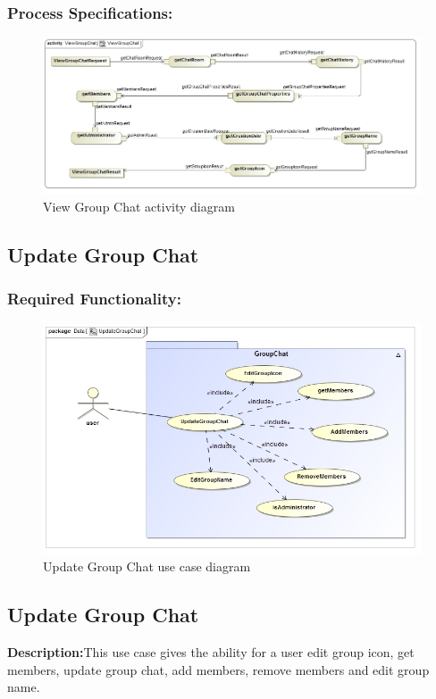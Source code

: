 \documentclass[a4paper]{article}
\begin{document}
\subsubsection{Process Specifications:} 
\begin{figure}[H]
\includegraphics[width=1\linewidth]{./pictures/view_GroupChat.jpg}
\caption{View Group Chat activity diagram}
\end{figure}


\subsection{Update Group Chat}
\subsubsection{Required Functionality:} 
\begin{figure}[H]
\includegraphics[width=1\linewidth]{./pictures/updateGroupChat.jpg}
\caption{Update Group Chat use case diagram}
\end{figure}

\subsection{Update Group Chat}
\textbf{Description:}This use case gives the ability for a user edit group icon, get members, update group chat, add members, remove members and edit group name. 
\end{document}
